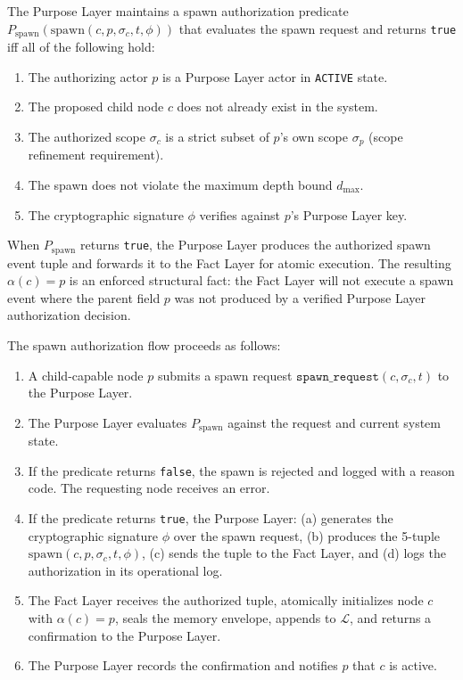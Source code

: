 \begin{dfn}
\label{dfn:spawn-auth}
The Purpose Layer maintains a spawn authorization predicate $P_{\text{spawn}}(\text{spawn}(c, p, \sigma_c, t, \phi))$ that evaluates the spawn request and returns \texttt{true} iff all of the following hold:

\begin{enumerate}
    \item The authorizing actor $p$ is a Purpose Layer actor in \texttt{ACTIVE} state.
    \item The proposed child node $c$ does not already exist in the system.
    \item The authorized scope $\sigma_c$ is a strict subset of $p$'s own scope $\sigma_p$ (scope refinement requirement).
    \item The spawn does not violate the maximum depth bound $d_{\max}$.
    \item The cryptographic signature $\phi$ verifies against $p$'s Purpose Layer key.
\end{enumerate}
\end{dfn}

When $P_{\text{spawn}}$ returns \texttt{true}, the Purpose Layer produces the authorized spawn event tuple and forwards it to the Fact Layer for atomic execution. The resulting $\alpha(c) = p$ is an enforced structural fact: the Fact Layer will not execute a spawn event where the parent field $p$ was not produced by a verified Purpose Layer authorization decision.

The spawn authorization flow proceeds as follows:

\begin{enumerate}
    \item A child-capable node $p$ submits a spawn request $\texttt{spawn\_request}(c, \sigma_c, t)$ to the Purpose Layer.
    \item The Purpose Layer evaluates $P_{\text{spawn}}$ against the request and current system state.
    \item If the predicate returns \texttt{false}, the spawn is rejected and logged with a reason code. The requesting node receives an error.
    \item If the predicate returns \texttt{true}, the Purpose Layer: (a) generates the cryptographic signature $\phi$ over the spawn request, (b) produces the 5-tuple $\mathrm{spawn}(c, p, \sigma_c, t, \phi)$, (c) sends the tuple to the Fact Layer, and (d) logs the authorization in its operational log.
    \item The Fact Layer receives the authorized tuple, atomically initializes node $c$ with $\alpha(c) = p$, seals the memory envelope, appends to $\mathcal{L}$, and returns a confirmation to the Purpose Layer.
    \item The Purpose Layer records the confirmation and notifies $p$ that $c$ is active.
\end{enumerate}

